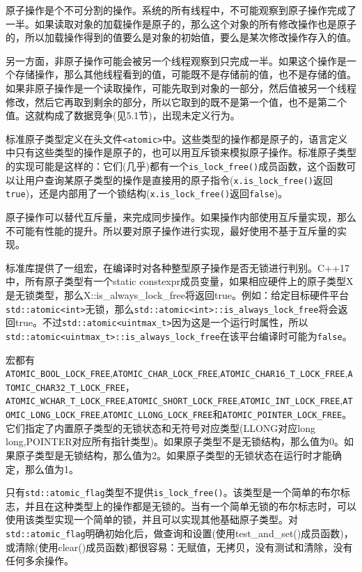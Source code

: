 
原子操作是个不可分割的操作。系统的所有线程中，不可能观察到原子操作完成了一半。如果读取对象的加载操作是原子的，那么这个对象的所有修改操作也是原子的，所以加载操作得到的值要么是对象的初始值，要么是某次修改操作存入的值。

另一方面，非原子操作可能会被另一个线程观察到只完成一半。如果这个操作是一个存储操作，那么其他线程看到的值，可能既不是存储前的值，也不是存储的值。如果非原子操作是一个读取操作，可能先取到对象的一部分，然后值被另一个线程修改，然后它再取到剩余的部分，所以它取到的既不是第一个值，也不是第二个值。这就构成了数据竞争(见5.1节)，出现未定义行为。


标准原子类型定义在头文件\texttt{<atomic>}中。这些类型的操作都是原子的，语言定义中只有这些类型的操作是原子的，也可以用互斥锁来模拟原子操作。标准原子类型的实现可能是这样的：它们(几乎)都有一个\texttt{is\_lock\_free()}成员函数，这个函数可以让用户查询某原子类型的操作是直接用的原子指令(\texttt{x.is\_lock\_free()}返回\texttt{true})，还是内部用了一个锁结构(\texttt{x.is\_lock\_free()}返回\texttt{false})。

原子操作可以替代互斥量，来完成同步操作。如果操作内部使用互斥量实现，那么不可能有性能的提升。所以要对原子操作进行实现，最好使用不基于互斥量的实现。

标准库提供了一组宏，在编译时对各种整型原子操作是否无锁进行判别。C++17中，所有原子类型有一个static constexpr成员变量，如果相应硬件上的原子类型X是无锁类型，那么X::is\_always\_lock\_free将返回true。例如：给定目标硬件平台\texttt{std::atomic<int>}无锁，那么\texttt{std::atomic<int>::is\_always\_lock\_free}将会返回true。不过\texttt{std::atomic<uintmax\_t>}因为这是一个运行时属性，所以\texttt{std::atomic<uintmax\_t>::is\_always\_lock\_free}在该平台编译时可能为\texttt{false}。

宏都有\texttt{ATOMIC\_BOOL\_LOCK\_FREE},\texttt{ATOMIC\_CHAR\_LOCK\_FREE},\texttt{ATOMIC\_CHAR16\_T\_LOCK\_FREE},\texttt{ATOMIC\_CHAR32\_T\_LOCK\_FREE}，\texttt{ATOMIC\_WCHAR\_T\_LOCK\_FREE},\texttt{ATOMIC\_SHORT\_LOCK\_FREE},\texttt{ATOMIC\_INT\_LOCK\_FREE},\texttt{ATOMIC\_LONG\_LOCK\_FREE},\texttt{ATOMIC\_LLONG\_LOCK\_FREE}和\texttt{ATOMIC\_POINTER\_LOCK\_FREE}。它们指定了内置原子类型的无锁状态和无符号对应类型(LLONG对应long long,POINTER对应所有指针类型)。如果原子类型不是无锁结构，那么值为0。如果原子类型是无锁结构，那么值为2。如果原子类型的无锁状态在运行时才能确定，那么值为1。

只有\texttt{std::atomic\_flag}类型不提供\texttt{is\_lock\_free()}。该类型是一个简单的布尔标志，并且在这种类型上的操作都是无锁的。当有一个简单无锁的布尔标志时，可以使用该类型实现一个简单的锁，并且可以实现其他基础原子类型。对\texttt{std::atomic\_flag}明确初始化后，做查询和设置(使用test\_and\_set()成员函数)，或清除(使用clear()成员函数)都很容易：无赋值，无拷贝，没有测试和清除，没有任何多余操作。

